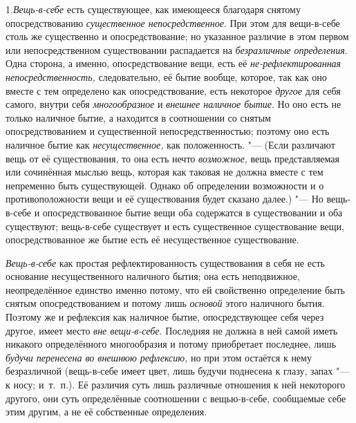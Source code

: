 1.{\em Вещь-в-себе} есть
существующее, как имеющееся благодаря снятому опосредствованию
{\em существенное непосредственное}. При этом для
вещи-в-себе столь же существенно и опосредствование; но указанное различие
в этом первом или непосредственном существовании распадается на
{\em безразличные определения}. Одна сторона, а именно,
опосредствование вещи, есть её {\em не-рефлектированная
непосредственность,} следовательно, её бытие вообще, которое, так как оно
вместе с тем определено как опосредствование, есть некоторое
{\em другое} для себя самого, внутри себя {\em многообразное} и {\em внешнее
наличное бытие}. Но оно есть не только наличное бытие, а находится в
соотношении со снятым опосредствованием и существенной непосредственностью;
поэтому оно есть наличное бытие как
{\em несущественное,} как положенность. "--- (Если
различают вещь от её существования, то она есть нечто
{\em возможное,} вещь представляемая или сочинённая
мыслью вещь, которая как таковая не должна вместе с тем непременно быть
существующей. Однако об определении возможности и о противоположности вещи
и её существования будет сказано далее.) "--- Но вещь-в-себе и
опосредствованное бытие вещи оба содержатся в существовании и оба
существуют; вещь-в-себе существует и есть существенное существование вещи,
опосредствованное же бытие есть её несущественное существование.

{\em Вещь-в-себе} как простая рефлектированность
существования в себя не есть основание несущественного наличного бытия; она
есть неподвижное, неопределённое единство именно потому, что ей свойственно
определение быть снятым опосредствованием и потому лишь
{\em основой} этого наличного бытия. Поэтому же и
рефлексия как наличное бытие, опосредствующее себя через другое, имеет
место {\em вне вещи-в-себе}. Последняя не должна в ней
самой иметь никакого определённого многообразия и потому приобретает
последнее, лишь {\em будучи перенесена во внешнюю
рефлексию,} но при этом остаётся к нему безразличной (вещь-в-себе имеет
цвет, лишь будучи поднесена к глазу, запах "--- к носу; и~т.~п.). Её различия
суть лишь различные отношения к ней некоторого другого, они суть
определённые соотношении с вещью-в-себе, сообщаемые себе этим другим, а не
её собственные определения.


